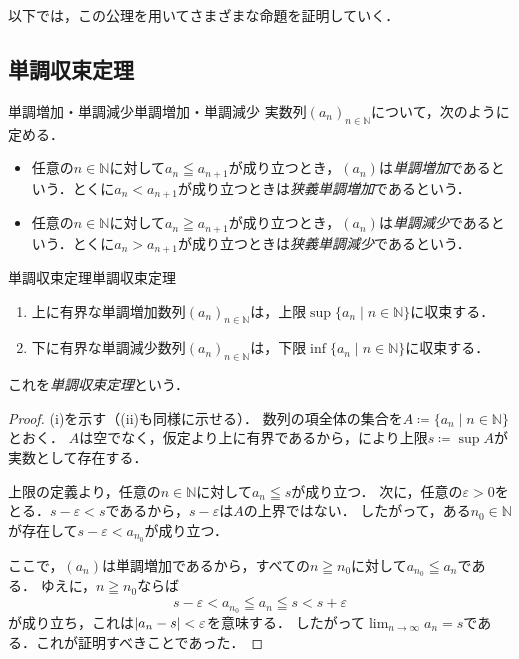 以下では，この公理を用いてさまざまな命題を証明していく．

\subsection{単調収束定理}

\begin{definition}{単調増加・単調減少}{単調増加・単調減少}
  実数列$(a_n)_{n \in \mathbb{N}}$について，次のように定める．
  \begin{itemize}
    \item 任意の$n \in \mathbb{N}$に対して$a_n \leqq a_{n+1}$が成り立つとき，$(a_n)$は\emph{単調増加}であるという．とくに$a_n < a_{n+1}$が成り立つときは\emph{狭義単調増加}であるという．
    \item 任意の$n \in \mathbb{N}$に対して$a_n \geqq a_{n+1}$が成り立つとき，$(a_n)$は\emph{単調減少}であるという．とくに$a_n > a_{n+1}$が成り立つときは\emph{狭義単調減少}であるという．
  \end{itemize}
\end{definition}

\begin{theorem}{単調収束定理}{単調収束定理}
  \begin{enumerate}[label=(\roman*),leftmargin=3.2em]
    \item 上に有界な単調増加数列$(a_n)_{n \in \mathbb{N}}$は，上限$\sup \{ a_n \mid n \in \mathbb{N} \}$に収束する．
    \item 下に有界な単調減少数列$(a_n)_{n \in \mathbb{N}}$は，下限$\inf \{ a_n \mid n \in \mathbb{N} \}$に収束する．
  \end{enumerate}
  これを\emph{単調収束定理}という．
\end{theorem}

\begin{tleftbar}
  \begin{proof}
    (i)を示す（(ii)も同様に示せる）．
    数列の項全体の集合を$A \coloneqq \{a_n \mid n \in \mathbb{N}\}$とおく．
    $A$は空でなく，仮定より上に有界であるから，により上限$s \coloneqq \sup A$が実数として存在する．

    上限の定義より，任意の$n \in \mathbb{N}$に対して$a_n \leqq s$が成り立つ．
    次に，任意の$\varepsilon > 0$をとる．$s - \varepsilon < s$であるから，$s - \varepsilon$は$A$の上界ではない．
    したがって，ある$n_0 \in \mathbb{N}$が存在して$s - \varepsilon < a_{n_0}$が成り立つ．

    ここで，$(a_n)$は単調増加であるから，すべての$n \geqq n_0$に対して$a_{n_0} \leqq a_n$である．
    ゆえに，$n \geqq n_0$ならば
    \[
      s - \varepsilon < a_{n_0} \leqq a_n \leqq s < s + \varepsilon
    \]
    が成り立ち，これは$\lvert a_n - s\rvert < \varepsilon$を意味する．
    したがって$\lim_{n \to \infty} a_n = s$である．これが証明すべきことであった．
  \end{proof}
\end{tleftbar}

